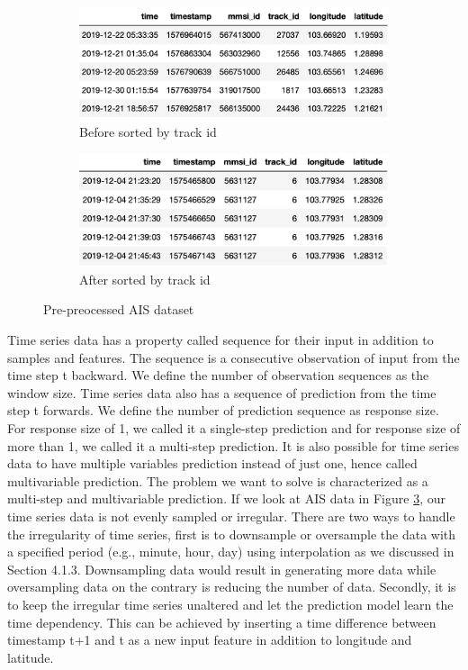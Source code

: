 \begin{figure}[t!]
\centering
\begin{subfigure}[b]{.45\textwidth}
  \centering
  \includegraphics[width=1\linewidth]{pic/ch-Univariate/dataset_random.png}
  \caption{Before sorted by track id}
  \label{fig:dataset_sub1}
\end{subfigure}
%
\begin{subfigure}[b]{.45\textwidth}
  \centering
  \includegraphics[width=1\linewidth]{pic/ch-Univariate/dataset_head.png}
  \caption{After sorted by track id}
  \label{fig:dataset_sub2}
\end{subfigure}
\caption{Pre-preocessed AIS dataset}
\label{fig:dataset}
\end{figure}

Time series data has a property called sequence for their input in addition to samples and features. The sequence is a consecutive observation of input from the time step t backward. We define the number of observation sequences as the window size. Time series data also has a sequence of prediction from the time step t forwards. We define the number of prediction sequence as response size. For response size of 1, we called it a single-step prediction and for response size of more than 1, we called it a multi-step prediction. It is also possible for time series data to have multiple variables prediction instead of just one, hence called multivariable prediction. The problem we want to solve is characterized as a multi-step and multivariable prediction. If we look at AIS data in Figure \ref{fig:dataset}, our time series data is not evenly sampled or irregular. There are two ways to handle the irregularity of time series, first is to downsample or oversample the data with a specified period (e.g., minute, hour, day) using interpolation as we discussed in Section 4.1.3. Downsampling data would result in generating more data while oversampling data on the contrary is reducing the number of data. Secondly, it is to keep the irregular time series unaltered and let the prediction model learn the time dependency. This can be achieved by inserting a time difference between timestamp t+1 and t as a new input feature in addition to longitude and latitude.

